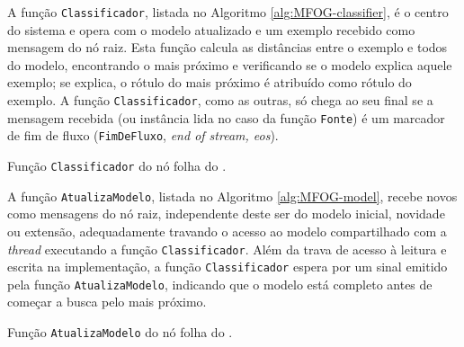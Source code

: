 A função \texttt{Classificador}, listada no Algoritmo \ref{alg:MFOG-classifier}, é o
centro do sistema e opera com o modelo atualizado e um exemplo recebido como
mensagem do nó raiz.
Esta função calcula as distâncias entre o exemplo e todos \mclusters do modelo,
encontrando o mais próximo e verificando se o modelo explica aquele exemplo; se
explica, o rótulo do \mcluster mais próximo é atribuído como rótulo do exemplo.
A função \texttt{Classificador}, como as outras, só chega ao seu final se a
mensagem recebida (ou instância lida no caso da função \texttt{Fonte}) é um
marcador de fim de fluxo (\texttt{FimDeFluxo}, \emph{end of stream, eos}).

\begin{algorithm}[htb]
    
\caption{Função \texttt{Classificador} do nó folha do \mfog.}
\label{alg:MFOG-classifier}
\end{algorithm}

A função \texttt{AtualizaModelo}, listada no Algoritmo
\ref{alg:MFOG-model}, recebe novos \mclusters como mensagens do nó raiz,
independente deste \mcluster ser do modelo inicial, novidade ou extensão,
adequadamente travando o acesso ao modelo compartilhado com a \emph{thread}
executando a função \texttt{Classificador}.
Além da trava de acesso à leitura e escrita na implementação, a função
\texttt{Classificador} espera por um sinal emitido pela função
\texttt{AtualizaModelo}, indicando que o modelo está completo antes de começar a
busca pelo \mclusters mais próximo.

\begin{algorithm}[htb]
    
\caption{Função \texttt{AtualizaModelo} do nó folha do \mfog.}
\label{alg:MFOG-model}
\end{algorithm}

